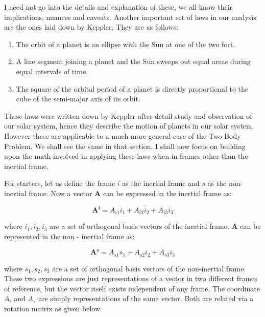 \documentclass[12pt, letterpaper]{article}
\begin{document}
I need not go into the details and explanation of these, we all know their implications, nuances and caveats. Another important set of laws in our analysis are the ones laid down by Keppler. They are as follows:
\begin{enumerate}

	\item The orbit of a planet is an ellipse with the Sun at one of the two foci.
	\item A line segment joining a planet and the Sun sweeps out equal areas during equal intervals of time.
	\item The square of the orbital period of a planet is directly proportional to the cube of the semi-major axis of its orbit.

\end{enumerate}

 These laws were written down by Keppler after detail study and observation of our solar system, hence they describe the motion of planets in our solar system. However these are applicable to a much more general case of the Two Body Problem. We shall see the same in that section. I shall now focus on building upon the math involved in applying these laws when in frames other than the inertial frame.

For starters, let us define the frame $i$ as the inertial frame and $s$ as the non-inertial frame. Now a vector $\mathbf{A}$ can be expressed in the inertial frame as:

\begin{displaymath} \mathbf{A^i} = A_{i1}i_1 + A_{i2}i_2 + A_{i3}i_3 \end{displaymath}
 
 where $i_1, i_2, i_3$ are a set of orthogonal basis vectors of the inertial frame. $\mathbf{A}$ can be represented in 
 the non - inertial frame as:

\begin{displaymath} \mathbf{A^s} = A_{s1}s_1 + A_{s2}i_2 + A_{s3}i_3 \end{displaymath}

where $s_1, s_2, s_3$ are a set of orthogonal basis vectors of the non-inertial frame. These two expressions are just representations of a vector in two different frames of reference, but the vector itself exists independent of any frame. The coordinate $A_i$ and $A_s$ are simply representations of the same vector. Both are related via a rotation matrix as given below. 
\end{document}
